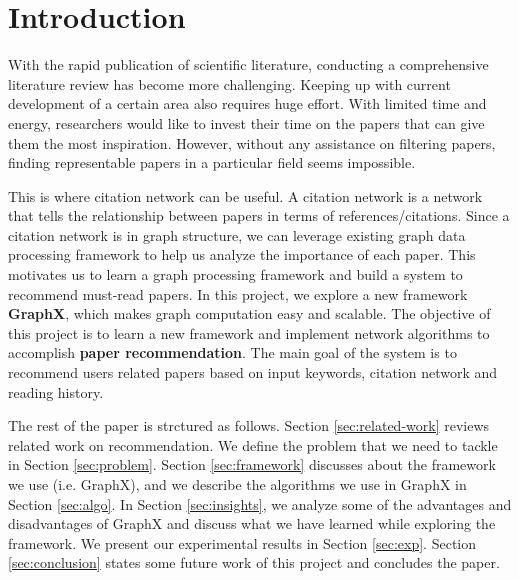 \section{Introduction}
%
With the rapid publication of scientific literature, conducting a comprehensive literature review has become more challenging.
%
Keeping up with current development of a certain area also requires huge effort.
%
With limited time and energy, researchers would like to invest their time on the papers that can give them the most inspiration.
%
However, without any assistance on filtering papers, finding representable papers in a particular field seems impossible.

%
This is where citation network can be useful.
%
A citation network is a network that tells the relationship between papers in terms of references/citations.
%
Since a citation network is in graph structure, we can leverage existing graph data processing framework to help us analyze the importance of each paper.
%
This motivates us to learn a graph processing framework and build a system to recommend must-read papers.
%
In this project, we explore a new framework \textbf{GraphX}, which makes graph computation easy and scalable.
%
The objective of this project is to learn a new framework and implement network algorithms to accomplish \textbf{paper recommendation}.
%
The main goal of the system is to recommend users related papers based on input keywords, citation network and reading history.
%

The rest of the paper is strctured as follows. 
%
Section \ref{sec:related-work} reviews related work on recommendation. 
%
We define the problem that we need to tackle in Section \ref{sec:problem}.
%
Section \ref{sec:framework} discusses about the framework we use (i.e. GraphX), and we describe the algorithms we use in GraphX in Section \ref{sec:algo}.
%
In Section \ref{sec:insights}, we analyze some of the advantages and disadvantages of GraphX and discuss what we have learned while exploring the framework.
%
We present our experimental results in Section \ref{sec:exp}.
%
Section \ref{sec:conclusion} states some future work of this project and concludes the paper.
